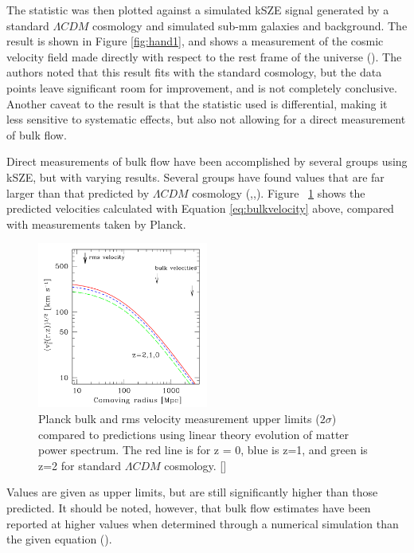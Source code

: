 \documentclass[manuscript]{aastex}
\begin{document}
The statistic was then plotted against a simulated kSZE signal generated by a standard $\Lambda CDM$  cosmology and simulated sub-mm galaxies and background.
The result is shown in Figure \ref{fig:hand1}, and shows a measurement of the cosmic velocity field made directly with respect to the rest frame of the universe (\cite{Hand2012}). The authors noted that this result fits with the standard cosmology, but the data points leave significant room for improvement, and is not completely conclusive. Another caveat to the result is that the statistic used is differential, making it less sensitive to systematic effects, but also not allowing for a direct measurement of bulk flow.  

Direct measurements of bulk flow have been accomplished by several groups using kSZE, but with varying results. Several groups have found values that are far larger than that predicted by \(\Lambda CDM\) cosmology (\cite{Kashlinsky2008},\cite{Watkins2009},\cite{Lavaux2010}). Figure ~\ref{fig:bulkflow} shows the predicted velocities calculated with Equation \ref{eq:bulkvelocity} above, compared with measurements taken by Planck. 
\begin{figure}
  \vspace{-0.8cm}
    \begin{center}
      \includegraphics[width=0.5\textwidth]{kitayama1.png}
    \end{center}
\caption[Planck constraints on bulk flow -(\cite{Kitayama2014})]{Planck bulk and rms velocity measurement upper limits (\(2\sigma\)) compared to predictions using linear theory evolution of matter power spectrum. The red line is for z = 0, blue is z=1, and green is z=2 for standard \(\Lambda CDM\) cosmology.  [\cite{Kitayama2014}]}
\label{fig:bulkflow}
\vspace{-0.8cm}
\end{figure}
Values are given as upper limits, but are still significantly higher than those predicted. It should be noted, however, that bulk flow estimates have been reported at higher values when determined through a numerical simulation than the given equation (\cite{Kitayama2014}).
\end{document}

